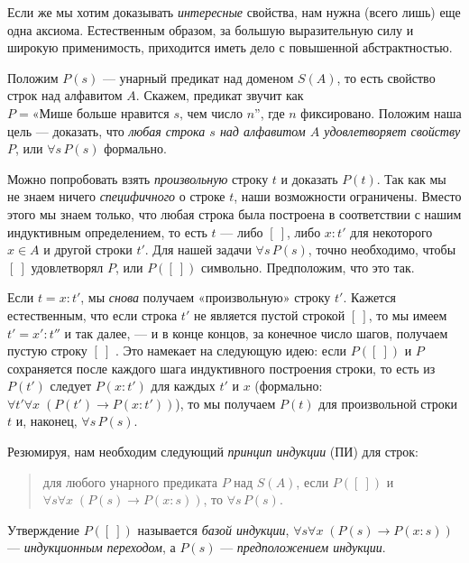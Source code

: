\documentclass[12pt,notitlepage]{article}
\theoremstyle{plain}
\theoremstyle{definition}
\theoremstyle{plain}
\newcommand{\1}{\mathbf{1}}
\newcommand{\0}{\mathbf{0}}
\begin{document}
Если же мы хотим доказывать \emph{интересные} свойства, нам нужна (всего лишь) еще одна аксиома. Естественным образом, за большую выразительную силу и широкую применимость, приходится иметь дело с повышенной абстрактностью.

Положим $P(s)$ --- унарный предикат над доменом $S(A)$, то есть свойство строк над алфавитом $A$. Скажем, предикат звучит как $P = \mbox{«Мише больше нравится $s$, чем число $n$''}$, где $n$ фиксировано. Положим наша цель --- доказать, что \emph{любая строка $s$ над алфавитом $A$ удовлетворяет свойству $P$}, или $\forall s\, P(s)$ формально.

Можно попробовать взять \emph{произвольную} строку $t$ и доказать $P(t)$. Так как мы не знаем ничего \emph{специфичного} о строке $t$, наши возможности ограничены. Вместо этого мы знаем только, что любая строка была построена в соответствии с нашим индуктивным определением, то есть $t$ --- либо $[\ ]$, либо $x : t'$ для некоторого $x \in A$ и другой строки $t'$. Для нашей задачи $\forall s\, P(s)$, точно необходимо, чтобы $[\ ]$ удовлетворял $P$, или $P([\ ])$ символьно. Предположим, что это так.

Если $t = x : t'$, мы \emph{снова} получаем «произвольную» строку $t'$. Кажется естественным, что если строка $t'$ не является пустой строкой $[\ ]$, то мы имеем  $t' = x' : t''$ и так далее, --- и в конце концов, за конечное число шагов, получаем пустую строку $[\ ]$ . Это намекает на следующую идею: если $P([\ ])$ и $P$ сохраняется после каждого шага индуктивного построения строки, то есть из $P(t')$ следует $P(x : t')$ для каждых $t'$ и $x$ (формально: $\forall t' \forall x\; (P(t') \to P(x:t'))$), то мы получаем $P( t )$ для произвольной строки $t$ и, наконец, $\forall s\, P(s)$.

Резюмируя, нам необходим следующий \emph{принцип индукции} (ПИ) для строк:
\begin{quote}
	для любого унарного предиката $P$ над $S(A)$, если $P([\ ])$ и $\forall s \forall x\; (P(s) \to P(x:s))$, то $\forall s\, P(s)$.
\end{quote}
Утверждение $P([\ ])$ называется \emph{базой индукции}, $\forall s \forall x\; (P(s) \to P(x:s))$ --- \emph{индукционным переходом}, а $P(s)$ --- \emph{предположением индукции}.
\end{document}
